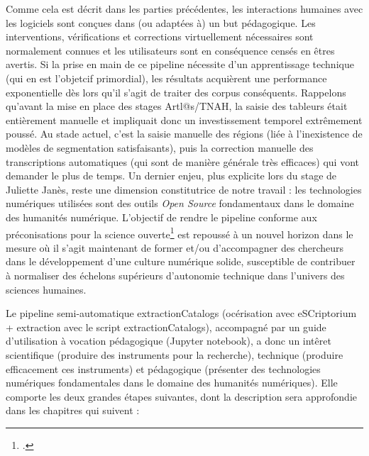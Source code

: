 \documentclass[a4paper,12pt,twoside]{book}
\begin{document}
Comme cela est décrit dans les parties précédentes, les interactions humaines avec les logiciels sont conçues dans (ou adaptées à) un but pédagogique. Les interventions, vérifications et corrections virtuellement nécessaires sont normalement connues et les utilisateurs sont en conséquence censés en êtres avertis. Si la prise en main de ce pipeline nécessite d'un apprentissage technique (qui en est l'objetcif primordial), les résultats acquièrent une performance exponentielle dès lors qu'il s'agit de traiter des corpus conséquents. Rappelons qu'avant la mise en place des stages Artl@s/TNAH, la saisie des tableurs était entièrement manuelle et impliquait donc un investissement temporel extrêmement poussé. Au stade actuel, c'est la saisie manuelle des régions (liée à l'inexistence de modèles de segmentation satisfaisants), puis la correction manuelle des transcriptions automatiques (qui sont de manière générale très efficaces) qui vont demander le plus de temps. 
Un dernier enjeu, plus explicite lors du stage de Juliette Janès, reste une dimension constitutrice de notre travail : les technologies numériques utilisées sont des outils \textit{Open Source} fondamentaux dans le domaine des humanités numérique. L'objectif de rendre le pipeline conforme aux préconisations pour la science ouverte\footcite{unesco_vers_2019} est repoussé à un nouvel horizon dans le mesure où il s'agit maintenant de former et/ou d'accompagner des chercheurs dans le développement d'une culture numérique solide, susceptible de contribuer à normaliser des échelons supérieurs d'autonomie technique dans l'univers des sciences humaines.

Le pipeline semi-automatique extractionCatalogs (océrisation avec eSCriptorium + extraction avec le script extractionCatalogs), accompagné par un guide d'utilisation à vocation pédagogique (Jupyter notebook), a donc un intêret scientifique (produire des instruments pour la recherche), technique (produire efficacement ces instruments) et pédagogique (présenter des technologies numériques fondamentales dans le domaine des humanités numériques). Elle comporte les deux grandes étapes suivantes, dont la description sera approfondie dans les chapitres qui suivent :
\end{document}
